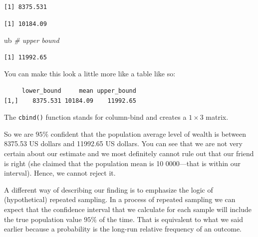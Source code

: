 \documentclass[]{article}
\newenvironment{Shaded}{\begin{snugshade}}{\end{snugshade}}
\newcommand{\KeywordTok}[1]{\textcolor[rgb]{0.13,0.29,0.53}{\textbf{#1}}}
\newcommand{\DataTypeTok}[1]{\textcolor[rgb]{0.13,0.29,0.53}{#1}}
\newcommand{\StringTok}[1]{\textcolor[rgb]{0.31,0.60,0.02}{#1}}
\newcommand{\CommentTok}[1]{\textcolor[rgb]{0.56,0.35,0.01}{\textit{#1}}}
\newcommand{\OperatorTok}[1]{\textcolor[rgb]{0.81,0.36,0.00}{\textbf{#1}}}
\newcommand{\NormalTok}[1]{#1}
\theoremstyle{definition}
\theoremstyle{definition}
\theoremstyle{definition}
\theoremstyle{remark}
\begin{document}
\begin{verbatim}
[1] 8375.531
\end{verbatim}

\begin{Shaded}
\end{Shaded}

\begin{verbatim}
[1] 10184.09
\end{verbatim}

\begin{Shaded}
\begin{Highlighting}[]
\NormalTok{ub }\CommentTok{# upper bound}
\end{Highlighting}
\end{Shaded}

\begin{verbatim}
[1] 11992.65
\end{verbatim}

You can make this look a little more like a table like so:

\begin{Shaded}
\end{Shaded}

\begin{verbatim}
     lower_bound     mean upper_bound
[1,]    8375.531 10184.09    11992.65
\end{verbatim}

The \texttt{cbind()} function stands for column-bind and creates a
\(1\times3\) matrix.

So we are \(95\%\) confident that the population average level of wealth
is between 8375.53 US dollars and 11992.65 US dollars. You can see that
we are not very certain about our estimate and we most definitely cannot
rule out that our friend is right (she claimed that the population mean
is 10 0000---that is within our interval). Hence, we cannot reject it.

A different way of describing our finding is to emphasize the logic of
(hypothetical) repeated sampling. In a process of repeated sampling we
can expect that the confidence interval that we calculate for each
sample will include the true population value \(95\%\) of the time. That
is equivalent to what we said earlier because a probability is the
long-run relative frequency of an outcome.
\end{document}
